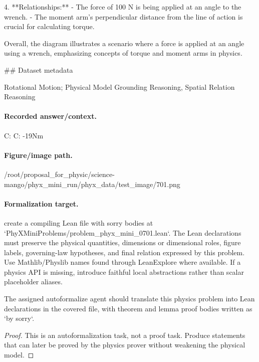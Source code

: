 4. **Relationships:**
   - The force of 100 N is being applied at an angle to the wrench.
   - The moment arm's perpendicular distance from the line of action is crucial for calculating torque.

Overall, the diagram illustrates a scenario where a force is applied at an angle using a wrench, emphasizing concepts of torque and moment arms in physics.

\#\# Dataset metadata

Rotational Motion; Physical Model Grounding Reasoning, Spatial Relation Reasoning

\paragraph{Recorded answer/context.}
C: C: -19Nm

\paragraph{Figure/image path.}
/root/proposal\_for\_physic/science-mango/phyx\_mini\_run/phyx\_data/test\_image/701.png

\paragraph{Formalization target.}
create a compiling Lean file with sorry bodies at `PhyXMiniProblems/problem\_phyx\_mini\_0701.lean`. The Lean declarations must preserve the physical quantities, dimensions or dimensional roles, figure labels, governing-law hypotheses, and final relation expressed by this problem.
Use Mathlib/Physlib names found through LeanExplore where available. If a physics API is missing, introduce faithful local abstractions rather than scalar placeholder aliases.

\begin{theorem}
\label{thm:physics:phyx_mini_0701:target}
The assigned autoformalize agent should translate this physics problem into Lean declarations in the covered file, with theorem and lemma proof bodies written as `by sorry`.
\end{theorem}
\begin{proof}
This is an autoformalization task, not a proof task. Produce statements that can later be proved by the physics prover without weakening the physical model.
\end{proof}

